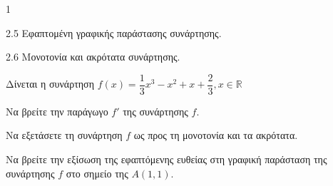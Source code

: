 \begin{ylh}{1}
    \item 2.5 Εφαπτομένη γραφικής παράστασης συνάρτησης.
    \item 2.6 Μονοτονία και ακρότατα συνάρτησης.
\end{ylh}
Δίνεται η συνάρτηση $f(x) = \dfrac{1}{3}x^3 - x^2 + x + \dfrac{2}{3}, x \in \mathbb{R}$
\begin{alist}
    \item Να βρείτε την παράγωγο $f'$ της συνάρτησης $f$. 
    \item Να εξετάσετε τη συνάρτηση $f$ ως προς τη μονοτονία και τα ακρότατα. 
    \item Να βρείτε την εξίσωση της εφαπτόμενης ευθείας στη γραφική παράσταση της συνάρτησης $f$ στο σημείο της $A(1,1)$. 
\end{alist}

